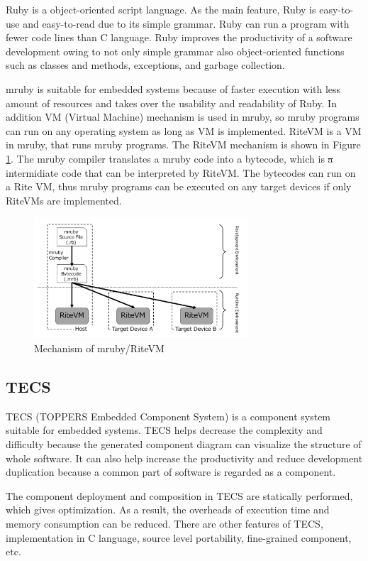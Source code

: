 \documentclass[conference,compsoc]{IEEEtran}
\providecommand{\DIFadd}[1]{{\protect\color{blue}\uwave{#1}}} %
\providecommand{\DIFdel}[1]{{\protect\color{red}\sout{#1}}}                      %
\providecommand{\DIFaddbegin}{} %
\providecommand{\DIFaddend}{} %
\providecommand{\DIFdelbegin}{} %
\providecommand{\DIFdelend}{} %
\begin{document}
Ruby is a object-oriented script language.
As the main feature, Ruby is easy-to-use and easy-to-read due to its simple grammar.
Ruby can run a program with fewer code lines than C language.
Ruby improves the productivity of a software development owing to not only simple grammar also object-oriented functions such as classes and methods, exceptions, and garbage collection.

mruby is suitable for embedded systems because of faster execution with less amount of resources and takes over the usability and readability of Ruby.
In addition VM (Virtual Machine) mechanism is used in mruby, so mruby programs can run on any operating system as long as VM is implemented.
RiteVM is a VM in mruby, that runs mruby programs.
The RiteVM mechanism is shown in Figure \ref{fig:mruby}.
The mruby compiler translates a mruby code into a bytecode, which is \DIFdelbegin \DIFdel{a }\DIFdelend \DIFaddbegin \DIFadd{an }\DIFaddend intermidiate code that can be interpreted by RiteVM.
The bytecodes can run on a Rite VM, thus mruby programs can be executed on any target devices if only RiteVMs are implemented.
\begin{figure}[t]
    \centering
    \includegraphics[width=8cm,clip]{figure/mruby.pdf}
    \caption{Mechanism of mruby/RiteVM}
    \label{fig:mruby}
\end{figure}

\subsection{TECS}
\label{sec:TECS}
TECS (TOPPERS Embedded Component System) is a component system suitable for embedded systems.
TECS helps decrease the complexity and difficulty because the generated component diagram can visualize the structure of whole software.
It can also help increase the productivity and reduce development duplication  because a common part of software is regarded as a component.

The component deployment and composition in TECS are statically performed, which gives optimization.
As a result, the overheads of execution time and memory consumption can be reduced.
There are other features of TECS, implementation in C language, source level portability, fine-grained component, etc.
\end{document}
